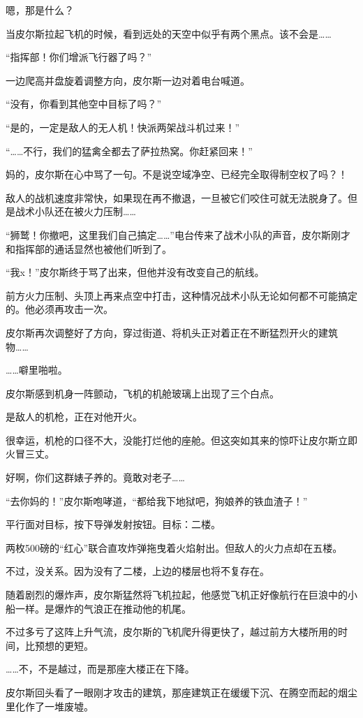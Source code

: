 嗯，那是什么？

当皮尔斯拉起飞机的时候，看到远处的天空中似乎有两个黑点。该不会是……

“指挥部！你们增派飞行器了吗？”

一边爬高并盘旋着调整方向，皮尔斯一边对着电台喊道。

“没有，你看到其他空中目标了吗？”

“是的，一定是敌人的无人机！快派两架战斗机过来！”

“……不行，我们的猛禽全都去了萨拉热窝。你赶紧回来！”

妈的，皮尔斯在心中骂了一句。不是说空域净空、已经完全取得制空权了吗？！

敌人的战机速度非常快，如果现在再不撤退，一旦被它们咬住可就无法脱身了。但是战术小队还在被火力压制……

“狮鹫！你撤吧，这里我们自己搞定……”电台传来了战术小队的声音，皮尔斯刚才和指挥部的通话显然也被他们听到了。

“我x！”皮尔斯终于骂了出来，但他并没有改变自己的航线。

前方火力压制、头顶上再来点空中打击，这种情况战术小队无论如何都不可能搞定的。他必须再攻击一次。

皮尔斯再次调整好了方向，穿过街道、将机头正对着正在不断猛烈开火的建筑物……

……噼里啪啦。

皮尔斯感到机身一阵颤动，飞机的机舱玻璃上出现了三个白点。

是敌人的机枪，正在对他开火。

很幸运，机枪的口径不大，没能打烂他的座舱。但这突如其来的惊吓让皮尔斯立即火冒三丈。

好啊，你们这群婊子养的。竟敢对老子……

“去你妈的！”皮尔斯咆哮道，“都给我下地狱吧，狗娘养的铁血渣子！”

平行面对目标，按下导弹发射按钮。目标：二楼。

两枚500磅的“红心”联合直攻炸弹拖曳着火焰射出。但敌人的火力点却在五楼。

不过，没关系。因为没有了二楼，上边的楼层也将不复存在。

随着剧烈的爆炸声，皮尔斯猛然将飞机拉起，他感觉飞机正好像航行在巨浪中的小船一样。是爆炸的气浪正在推动他的机尾。

不过多亏了这阵上升气流，皮尔斯的飞机爬升得更快了，越过前方大楼所用的时间，比预想的更短。

……不，不是越过，而是那座大楼正在下降。

皮尔斯回头看了一眼刚才攻击的建筑，那座建筑正在缓缓下沉、在腾空而起的烟尘里化作了一堆废墟。

